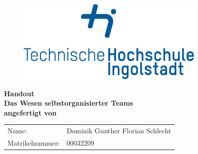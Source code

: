 

\phantom{tmpText}


\begin{figure}[h!]
\centering
\includegraphics[width=.5\textwidth]{bilder/thi_logo_cropped.pdf}
\end{figure}

  \begin{center}
    
    
    \textbf{{\large Handout} \\[3ex]
    {\LARGE Das Wesen selbstorganisierter Teams} \\[1ex]
    angefertigt von} \\
    \begin{tabular}{ll}
    	Name: & Dominik Gunther Florian Schlecht\\
    	Matrikelnummer: & 00032209\\[2ex]
    \end{tabular}\\[5ex] %
  \end{center}
